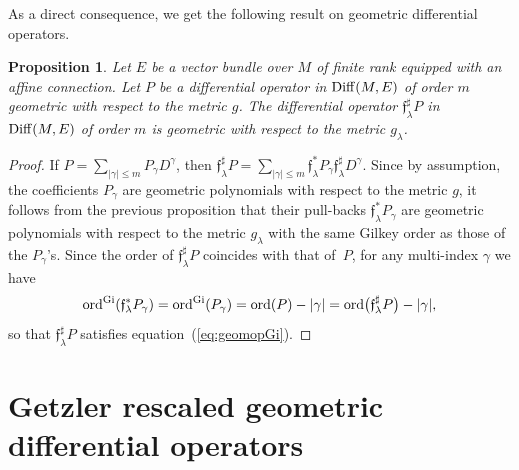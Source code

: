 \documentclass[pdftex]{sigma}
\numberwithin{equation}{section}
\newtheorem{prop}[thm]{Proposition}
\theoremstyle{definition}
\begin{document}
As a direct consequence, we get the following result on geometric differential operators.
\begin{prop} \label{pro:geometricopes} Let $E$ be a vector bundle over $M$ of finite rank equipped with an affine connection. Let $P$ be a differential operator in $ {\rm Diff}(M, E)$ of order $m$ geometric with respect to the metric $g$. The differential operator $\mathfrak{f}_\lambda^\sharp P$ in $ {\rm Diff}(M, E)$ of order $m$ is geometric with respect to the metric $g_\lambda$.
\end{prop}
\begin{proof} { If $P= \sum_{\vert \gamma\vert \leq m} P_\gamma D^\gamma$, then $\mathfrak{f}_\lambda^\sharp P= \sum_{\vert \gamma\vert \leq m} \mathfrak{f}_\lambda^* P_\gamma \mathfrak{f}_\lambda^\sharp D^\gamma$.
Since by assumption, the coefficients $ P_\gamma$ are geometric polynomials with respect to the metric $g$, it follows from the previous proposition that their pull-backs $\mathfrak{f}_\lambda^* P_\gamma $ are geometric polynomials with respect to the metric $g_\lambda$ with the same Gilkey order as those of the $P_\gamma$'s. Since the order of $\mathfrak{f}_\lambda^\sharp P$ coincides with that of~$P$, for any multi-index $\gamma$ we have
\[ {\rm ord}^{\rm Gi}(\mathfrak{f}_\lambda^* P_{\gamma})= {\rm ord}^{\rm Gi}(P_{\gamma})={\rm ord}(P)- |\gamma|={\rm ord}\bigl(\mathfrak{f}_\lambda^\sharp P\bigr)- |\gamma|,\]
so that $\mathfrak{f}_\lambda^\sharp P$ satisfies equation~(\ref{eq:geomopGi}).}
\end{proof}
 	
\section{Getzler rescaled geometric differential operators}
\end{document}

